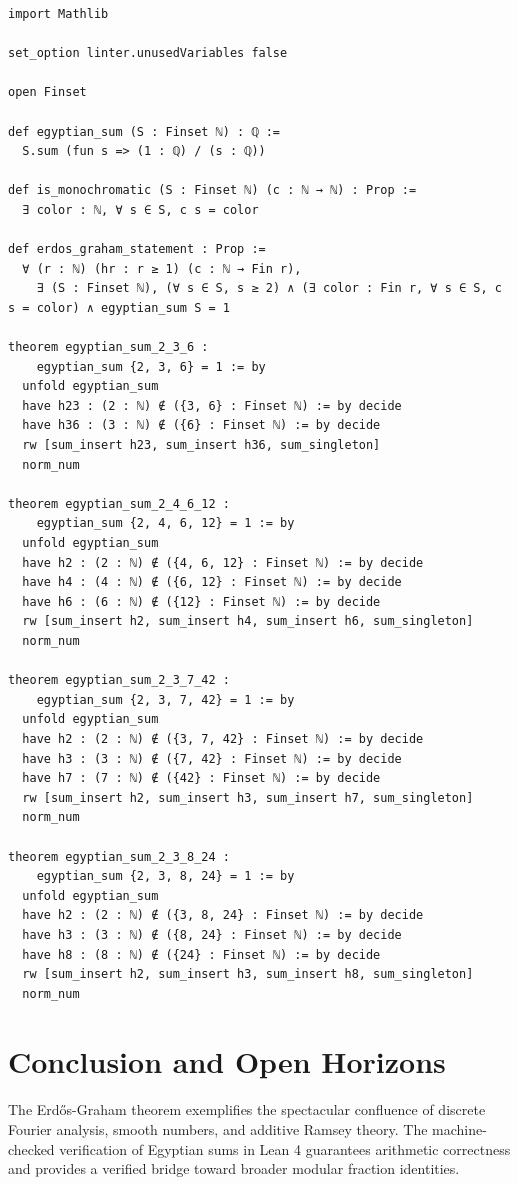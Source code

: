 \documentclass[11pt,a4paper]{article}
\theoremstyle{definition}
\begin{document}
\begin{lstlisting}[caption={Formal Lean 4 Implementation of Egyptian Fraction Theorems}]
import Mathlib

set_option linter.unusedVariables false

open Finset

def egyptian_sum (S : Finset ℕ) : ℚ :=
  S.sum (fun s => (1 : ℚ) / (s : ℚ))

def is_monochromatic (S : Finset ℕ) (c : ℕ → ℕ) : Prop :=
  ∃ color : ℕ, ∀ s ∈ S, c s = color

def erdos_graham_statement : Prop :=
  ∀ (r : ℕ) (hr : r ≥ 1) (c : ℕ → Fin r),
    ∃ (S : Finset ℕ), (∀ s ∈ S, s ≥ 2) ∧ (∃ color : Fin r, ∀ s ∈ S, c s = color) ∧ egyptian_sum S = 1

theorem egyptian_sum_2_3_6 :
    egyptian_sum {2, 3, 6} = 1 := by
  unfold egyptian_sum
  have h23 : (2 : ℕ) ∉ ({3, 6} : Finset ℕ) := by decide
  have h36 : (3 : ℕ) ∉ ({6} : Finset ℕ) := by decide
  rw [sum_insert h23, sum_insert h36, sum_singleton]
  norm_num

theorem egyptian_sum_2_4_6_12 :
    egyptian_sum {2, 4, 6, 12} = 1 := by
  unfold egyptian_sum
  have h2 : (2 : ℕ) ∉ ({4, 6, 12} : Finset ℕ) := by decide
  have h4 : (4 : ℕ) ∉ ({6, 12} : Finset ℕ) := by decide
  have h6 : (6 : ℕ) ∉ ({12} : Finset ℕ) := by decide
  rw [sum_insert h2, sum_insert h4, sum_insert h6, sum_singleton]
  norm_num

theorem egyptian_sum_2_3_7_42 :
    egyptian_sum {2, 3, 7, 42} = 1 := by
  unfold egyptian_sum
  have h2 : (2 : ℕ) ∉ ({3, 7, 42} : Finset ℕ) := by decide
  have h3 : (3 : ℕ) ∉ ({7, 42} : Finset ℕ) := by decide
  have h7 : (7 : ℕ) ∉ ({42} : Finset ℕ) := by decide
  rw [sum_insert h2, sum_insert h3, sum_insert h7, sum_singleton]
  norm_num

theorem egyptian_sum_2_3_8_24 :
    egyptian_sum {2, 3, 8, 24} = 1 := by
  unfold egyptian_sum
  have h2 : (2 : ℕ) ∉ ({3, 8, 24} : Finset ℕ) := by decide
  have h3 : (3 : ℕ) ∉ ({8, 24} : Finset ℕ) := by decide
  have h8 : (8 : ℕ) ∉ ({24} : Finset ℕ) := by decide
  rw [sum_insert h2, sum_insert h3, sum_insert h8, sum_singleton]
  norm_num
\end{lstlisting}

\section{Conclusion and Open Horizons}
The Erd\H{o}s-Graham theorem exemplifies the spectacular confluence of discrete Fourier analysis, smooth numbers, and additive Ramsey theory. The machine-checked verification of Egyptian sums in Lean 4 guarantees arithmetic correctness and provides a verified bridge toward broader modular fraction identities.
\end{document}
